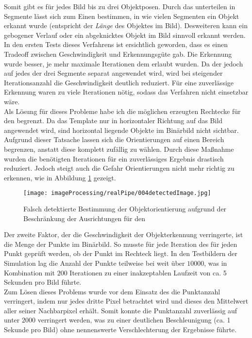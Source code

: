 Somit gibt es für jedes Bild bis zu drei Objektposen. Durch das unterteilen in Segmente lässt sich zum Einen bestimmen, in wie vielen Segmenten ein Objekt erkannt wurde (entspricht der \textit{Länge} des Objektes im Bild). Desweiteren kann ein gebogener Verlauf oder ein abgeknicktes Objekt im Bild sinnvoll erkannt werden.\\
In den ersten Tests dieses Verfahrens ist ersichtlich geworden, dass es einen Tradeoff zwischen Geschwindigkeit und Erkennungsgüte gab. Die Erkennung wurde besser, je mehr maximale Iterationen dem \rans erlaubt wurden. Da der \rans jedoch auf jedes der drei Segmente separat angewendet wird, wird bei steigender Iterationsanzahl die Geschwindigkeit deutlich reduziert. Für eine zuverlässige Erkennung waren zu viele Iterationen nötig, sodass das Verfahren nicht einsetzbar wäre.\\
Als Lösung für dieses Probleme habe ich die möglichen erzeugten Rechtecke für den \rans begrenzt. Da das Template nur in horizontaler Richtung auf das Bild angewendet wird, sind horizontal liegende Objekte im Binärbild nicht sichtbar. Aufgrund dieser Tatsache lassen sich die Orientierungen auf einen Bereich begrenzen, anstatt diese komplett zufällig zu wählen. Durch diese Maßnahme wurden die benötigten Iterationen für ein zuverlässiges Ergebnis drastisch reduziert. Jedoch steigt auch die Gefahr Orientierungen nicht mehr richtig zu erkennen, wie in Abbildung \ref{detecFail} gezeigt.\\
\begin{figure}[H]
\centering
\texttt{[image: imageProcessing/realPipe/004detectedImage.jpg]}
\caption{Falsch detektierte Bestimmung der Objektorientierung aufgrund der Beschränkung der Ausrichtungen für den \rans}
\label{detecFail}
\end{figure}
Der zweite Faktor, der die Geschwindigkeit der Objekterkennung verringerte, ist die Menge der Punkte im Binärbild. So musste für jede Iteration des \rans für jeden Punkt geprüft werden, ob der Punkt im Rechteck liegt. In den Testbildern der Simulation lag die Anzahl der Punkte teilweise bei weit über $10000$, was in Kombination mit $200$ Iterationen zu einer inakzeptablen Laufzeit von ca. 5 Sekunden pro Bild führte.\\
Zum Lösen dieses Problems wurde vor dem Einsatz des \rans die Punktanzahl verringert, indem nur jedes dritte Pixel betrachtet wird und dieses den Mittelwert aller seiner Nachbarpixel erhält.  Somit konnte die Punktanzahl zuverlässig auf unter $2000$ verringert werden, was zu einer deutlichen Beschleunigung (ca. 1 Sekunde pro Bild) ohne nennenswerte Verschlechterung der Ergebnisse führte.
